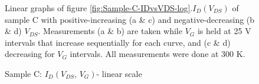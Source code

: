 \begin{figure}
\begin{centering}
{\begin{minipage}[t]{0.3\paperwidth}
\begin{flushright}
\par\end{flushright}%
\end{minipage}}\quad{}
\par\end{centering}
\caption{Sample C: $I_{D}\left(V_{DS},\,V_{G}\right)$- linear scale\label{fig:Sample-C-IDvsVDS-linear}}

Linear graphs of figure \ref{fig:Sample-C-IDvsVDS-log}.$I_{D}\left(V_{DS}\right)$
of sample C with positive-increasing (a \& c) and negative-decreasing
(b \& d) $V_{DS}$. Measurements (a \& b) are taken while $V_{G}$
is held at 25 V intervals that increase sequentially for each curve,
and (c \& d) decreasing for $V_{G}$ intervals. All measurements were
done at 300 K.
\end{figure}

